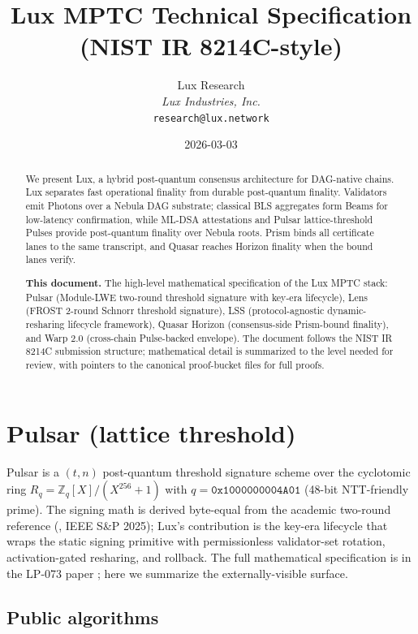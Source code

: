 \documentclass[11pt,a4paper]{article}
\title{Lux MPTC Technical Specification\\(NIST IR 8214C-style)}
\author{
Lux Research\\
\textit{Lux Industries, Inc.}\\
\texttt{research@lux.network}
}
\date{2026-03-03}
\begin{document}
\luxcoverpage

\begin{abstract}
\noindent We present Lux, a hybrid post-quantum consensus architecture for DAG-native chains. Lux separates fast operational finality from durable post-quantum finality. Validators emit Photons over a Nebula DAG substrate; classical BLS aggregates form Beams for low-latency confirmation, while ML-DSA attestations and Pulsar lattice-threshold Pulses provide post-quantum finality over Nebula roots. Prism binds all certificate lanes to the same transcript, and Quasar reaches Horizon finality when the bound lanes verify.

\textbf{This document.} The high-level mathematical specification of the Lux MPTC stack: Pulsar (Module-LWE two-round threshold signature with key-era lifecycle), Lens (FROST 2-round Schnorr threshold signature), LSS (protocol-agnostic dynamic-resharing lifecycle framework), Quasar Horizon (consensus-side Prism-bound finality), and Warp 2.0 (cross-chain Pulse-backed envelope). The document follows the NIST IR 8214C submission structure; mathematical detail is summarized to the level needed for review, with pointers to the canonical proof-bucket files for full proofs.
\end{abstract}

\tableofcontents
\newpage

\section{Pulsar (lattice threshold)}
\label{sec:spec-pulsar}

Pulsar is a $(t, n)$ post-quantum threshold signature scheme over the cyclotomic ring $R_q = \mathbb{Z}_q[X]/(X^{256}+1)$ with $q = \texttt{0x1000000004A01}$ (48-bit NTT-friendly prime). The signing math is derived byte-equal from the academic two-round reference (\cite{ringtail}, IEEE S\&P 2025); Lux's contribution is the key-era lifecycle that wraps the static signing primitive with permissionless validator-set rotation, activation-gated resharing, and rollback. The full mathematical specification is in the LP-073 paper \cite{luxpulsar}; here we summarize the externally-visible surface.

\subsection{Public algorithms}
\end{document}
